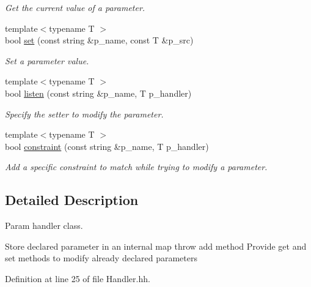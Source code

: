 \begin{DoxyCompactItemize}
\begin{DoxyCompactList}\small\item\em Get the current value of a parameter. \end{DoxyCompactList}\item 
{\footnotesize template$<$typename T $>$ }\\bool \hyperlink{classxtd_1_1servers_1_1param_1_1Handler_af8dbec0f2d639d39fb11605609462dee}{set} (const string \&p\-\_\-name, const T \&p\-\_\-src)
\begin{DoxyCompactList}\small\item\em Set a parameter value. \end{DoxyCompactList}\item 
{\footnotesize template$<$typename T $>$ }\\bool \hyperlink{classxtd_1_1servers_1_1param_1_1Handler_a3e71b80a00c962a862c1d3cc4d623c05}{listen} (const string \&p\-\_\-name, T p\-\_\-handler)
\begin{DoxyCompactList}\small\item\em Specify the setter to modify the parameter. \end{DoxyCompactList}\item 
{\footnotesize template$<$typename T $>$ }\\bool \hyperlink{classxtd_1_1servers_1_1param_1_1Handler_a20d689629d4748c14e4a516580a7c55a}{constraint} (const string \&p\-\_\-name, T p\-\_\-handler)
\begin{DoxyCompactList}\small\item\em Add a specific constraint to match while trying to modify a parameter. \end{DoxyCompactList}\end{DoxyCompactItemize}


\subsection{Detailed Description}
Param handler class. 

Store declared parameter in an internal map throw add method Provide get and set methods to modify already declared parameters 

Definition at line 25 of file Handler.\-hh.




